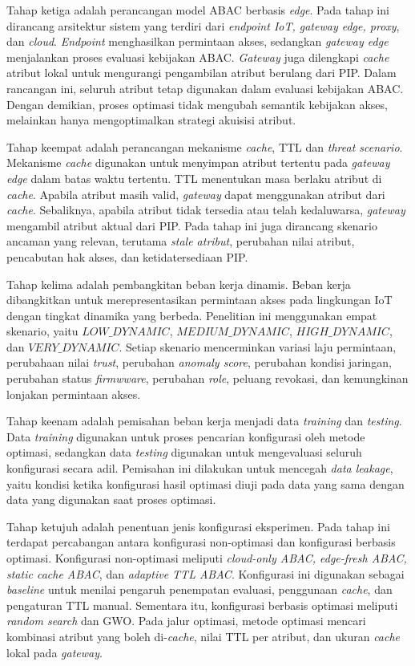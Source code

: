 Tahap ketiga adalah perancangan model ABAC berbasis \textit{edge}. Pada tahap ini dirancang arsitektur sistem yang terdiri dari \textit{endpoint IoT, gateway edge, proxy}, dan \textit{cloud}. \textit{Endpoint} menghasilkan permintaan akses, sedangkan \textit{gateway edge} menjalankan proses evaluasi kebijakan ABAC. \textit{Gateway} juga dilengkapi \textit{cache} atribut lokal untuk mengurangi pengambilan atribut berulang dari PIP. Dalam rancangan ini, seluruh atribut tetap digunakan dalam evaluasi kebijakan ABAC. Dengan demikian, proses optimasi tidak mengubah semantik kebijakan akses, melainkan hanya mengoptimalkan strategi akuisisi atribut.

Tahap keempat adalah perancangan mekanisme \textit{cache}, TTL dan \textit{threat scenario}. Mekanisme \textit{cache} digunakan untuk menyimpan atribut tertentu pada \textit{gateway edge} dalam batas waktu tertentu. TTL menentukan masa berlaku atribut di \textit{cache}. Apabila atribut masih valid, \textit{gateway} dapat menggunakan atribut dari \textit{cache}. Sebaliknya, apabila atribut tidak tersedia atau telah kedaluwarsa, \textit{gateway} mengambil atribut aktual dari PIP. Pada tahap ini juga dirancang skenario ancaman yang relevan, terutama \textit{stale atribut}, perubahan nilai atribut, pencabutan hak akses, dan ketidatersediaan PIP.

Tahap kelima adalah pembangkitan beban kerja dinamis. Beban kerja dibangkitkan untuk merepresentasikan permintaan akses pada lingkungan IoT dengan tingkat dinamika yang berbeda. Penelitian ini menggunakan empat skenario, yaitu $LOW\_DYNAMIC$, $MEDIUM\_DYNAMIC$, $HIGH\_DYNAMIC$, dan $VERY\_DYNAMIC$. Setiap skenario mencerminkan variasi laju permintaan, perubahaan nilai \textit{trust}, perubahan \textit{anomaly score}, perubahan kondisi jaringan, perubahan status \textit{firmwware}, perubahan \textit{role}, peluang revokasi, dan kemungkinan lonjakan permintaan akses.

Tahap keenam adalah pemisahan beban kerja menjadi data \textit{training} dan \textit{testing}. Data \textit{training} digunakan untuk proses pencarian konfigurasi oleh metode optimasi, sedangkan data \textit{testing} digunakan untuk mengevaluasi seluruh konfigurasi secara adil. Pemisahan ini dilakukan untuk mencegah \textit{data leakage}, yaitu kondisi ketika konfigurasi hasil optimasi diuji pada data yang sama dengan data yang digunakan saat proses optimasi.

Tahap ketujuh adalah penentuan jenis konfigurasi eksperimen. Pada tahap ini terdapat percabangan antara konfigurasi non-optimasi dan konfigurasi berbasis optimasi. Konfigurasi non-optimasi meliputi \textit{cloud-only ABAC, edge-fresh ABAC, static cache ABAC}, dan \textit{adaptive TTL ABAC}. Konfigurasi ini digunakan sebagai \textit{baseline} untuk menilai pengaruh penempatan evaluasi, penggunaan \textit{cache}, dan pengaturan TTL manual. Sementara itu, konfigurasi berbasis optimasi meliputi \textit{random search} dan GWO. Pada jalur optimasi, metode optimasi mencari kombinasi atribut yang boleh di-\textit{cache}, nilai TTL per atribut, dan ukuran \textit{cache} lokal pada \textit{gateway}.

